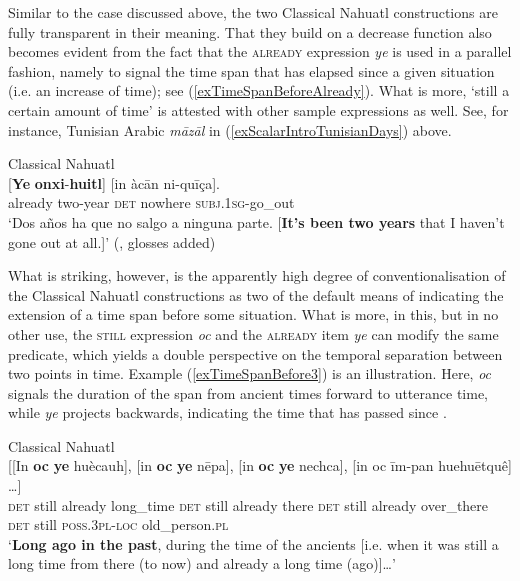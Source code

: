 Similar to the  case discussed above, the two Classical Nahuatl constructions are fully transparent in their meaning. That they build on a decrease function also becomes evident from the fact that the \textsc{already} expression \textit{ye} is used in a parallel fashion, namely to signal the time span that has elapsed since a given situation (i.e. an increase of time); see (\ref{exTimeSpanBeforeAlready}). What is more, \lq still a certain amount of time\rq{ }is attested with other sample expressions as well. See, for instance, Tunisian Arabic \textit{māzāl} in (\ref{exScalarIntroTunisianDays}) above.

\begin{exe}
	\ex\label{exTimeSpanBeforeAlready}Classical Nahuatl\\
	\gll  \textup{[}\textbf{Ye} \textbf{onxi}-\textbf{huitl}\textup{]} \textup{[}in àcān ni-quīça\textup{]}.\\
	\phantom{[}already two-year \phantom{[}\textsc{det} nowhere \textsc{subj}.1\textsc{sg}-go\_out\\
\glt \lq Dos años ha que no salgo a ninguna parte. [\textbf{It's been two years} that I haven't gone out at all.]' (\cite[503]{Carochi1645},  glosses added)
\end{exe}

What is striking, however, is the apparently high degree of conventionalisation of the Classical Nahuatl constructions as two of the default means of indicating the extension of a time span before some situation. What is more, in this, but in no other use, the \textsc{still} expression \textit{oc} and the \textsc{already} item \textit{ye} can modify the same predicate, which yields a double perspective on the temporal separation between two points in time. Example (\ref{exTimeSpanBefore3}) is an illustration. Here, \textit{oc} signals the duration of the span from ancient times forward to utterance time, while \textit{ye} projects backwards, indicating the time that has passed since \parencite[1269]{Launey1986}.

\begin{exe}
	\ex Classical Nahuatl \label{exTimeSpanBefore3}\\
	\gll \textup{[}\textup{[}In \textbf{oc} \textbf{ye} huècauh\textup{]}, \textup{[}in \textbf{oc} \textbf{ye} nēpa\textup{]}, \textup{[}in \textbf{oc} \textbf{ye} nechca\textup{]}, \textup{[}in oc īm-pan huehuētquê\textup{]} …\textup{]}\\
	\phantom{[}\phantom{[}\textsc{det} still already long\_time \phantom{[}\textsc{det} still already there \phantom{[}\textsc{det} still already over\_there \phantom{[}\textsc{det} still \textsc{poss}.3\textsc{pl}-\textsc{loc} old\_person.\textsc{pl}\\
	\glt\lq \textbf{Long ago in the past}, during the time of the ancients [i.e. when it was still a long time from there (to now) and already a long time (ago)]…' \parencite[369]{LauneyMackay2011}
\end{exe}

